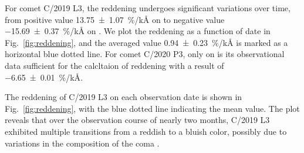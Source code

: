 For comet C/2019 L3, the reddening undergoes significant variations over time, from positive value {\SI{13.75 +- 1.07}{\percent/\kilo\angstrom}} on  to negative value {\SI{-15.69 +- 0.37}{\percent/\kilo\angstrom}} on . We plot the reddening as a function of date in Fig.~\ref{fig:reddening}, and the averaged value {\SI{0.94 +- 0.23}{\percent/\kilo\angstrom}} is marked as a horizontal blue dotted line. For comet C/2020 P3, only on  is its observational data sufficient for the calcltaion of reddening with a result of {\SI{-6.65 +- 0.01}{\percent/\kilo\angstrom}}. 

The reddening of C/2019 L3 on each observation date is shown in Fig.~\ref{fig:reddening}, with the blue dotted line indicating the mean value. The plot reveals that over the observation course of nearly two months, C/2019 L3 exhibited multiple transitions from a reddish to a bluish color, possibly due to variations in the composition of the coma \citep{ivanova_colour_2017}. 

